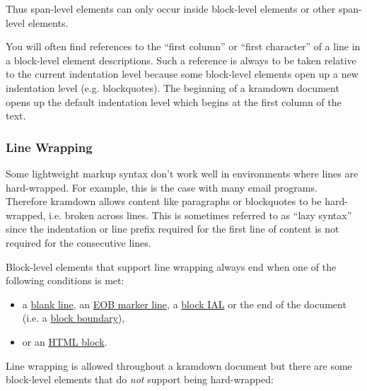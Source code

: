 \documentclass[a4paper]{article}
\begin{document}
Thus span-level elements can only occur inside block-level elements or
other span-level elements.

You will often find references to the ``first column'' or ``first
character'' of a line in a block-level element descriptions. Such a
reference is always to be taken relative to the current indentation
level because some block-level elements open up a new indentation level
(e.g. blockquotes). The beginning of a kramdown document opens up the
default indentation level which begins at the first column of the text.

\hypertarget{line-wrapping}{\subsubsection{Line
Wrapping}\label{line-wrapping}}

Some lightweight markup syntax don't work well in environments where
lines are hard-wrapped. For example, this is the case with many email
programs. Therefore kramdown allows content like paragraphs or
blockquotes to be hard-wrapped, i.e. broken across lines. This is
sometimes referred to as ``lazy syntax'' since the indentation or line
prefix required for the first line of content is not required for the
consecutive lines.

Block-level elements that support line wrapping always end when one of
the following conditions is met:

\begin{itemize}
\item
  a \protect\hyperlink{blank-lines}{blank line}, an
  \protect\hyperlink{eob-marker}{EOB marker line}, a
  \protect\hyperlink{block-ials}{block IAL} or the end of the document
  (i.e. a \protect\hyperlink{block-boundaries}{block boundary}),
\item
  or an \protect\hyperlink{html-blocks}{HTML block}.
\end{itemize}

Line wrapping is allowed throughout a kramdown document but there are
some block-level elements that do \emph{not} support being hard-wrapped:
\end{document}
